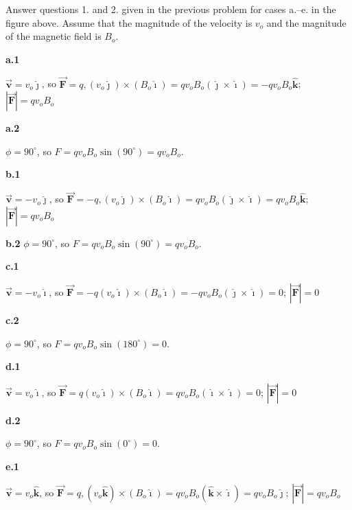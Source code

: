 \documentclass{article}
\newcommand{\ihat}[0]{\hat{\boldsymbol{\imath}}}
\newcommand{\jhat}[0]{\hat{\boldsymbol{\jmath}}}
\newcommand{\khat}[0]{\hat{\boldsymbol{k}}}
\newcommand{\bfvec}[1]{\vec{\mathbf{#1}}}
\begin{document}
Answer questions 1. and 2. given in the previous problem for cases a.--e. in the figure above. Assume that the magnitude of the velocity is $v_o$ and the magnitude of the magnetic field is $B_o$.

{\bf a.1}

\ifsolutions
$\bfvec{v}=v_o\jhat$, so $\bfvec{F} = q,(v_o\jhat)\times (B_o\ihat)=qv_oB_o(\jhat\times \ihat)=-qv_oB_o\khat$; $|\bfvec{F}|=qv_oB_o$
\else

\vskip 48pt
\fi
\ifsolutions\else
\vskip 48pt
\fi

{\bf a.2}

\ifsolutions
$\phi=90^{\circ}$, so $F = qv_oB_o\sin(90^{\circ})=qv_oB_o$.
\fi

{\bf b.1}

\ifsolutions
$\bfvec{v}=-v_o\jhat$, so $\bfvec{F} = -q,(v_o\jhat)\times (B_o\ihat)=qv_oB_o(\jhat\times \ihat)=qv_oB_o\khat$; $|\bfvec{F}|=qv_oB_o$
\else

\vskip 48pt
\fi
\ifsolutions\else
\vskip 48pt
\fi
{\bf b.2}
\ifsolutions
$\phi=90^{\circ}$, so $F = qv_oB_o\sin(90^{\circ})=qv_oB_o$.
\else

\vskip 48pt
\fi
\ifsolutions\else
\vskip 48pt
\fi

{\bf c.1}

\ifsolutions
$\bfvec{v}=-v_o\ihat$, so $\bfvec{F} = -q(v_o\ihat)\times (B_o\ihat)=-qv_oB_o(\jhat\times \ihat)=0$; $|\bfvec{F}|=0$
\else

\vskip 48pt
\fi
\ifsolutions\else
\vskip 48pt
\fi

{\bf c.2}

\ifsolutions
$\phi=90^{\circ}$, so $F = qv_oB_o\sin(180^{\circ})=0$.
\else

\vskip 48pt
\fi
\ifsolutions\else
\vskip 48pt
\fi

{\bf d.1}

\ifsolutions
$\bfvec{v}=v_o\ihat$, so $\bfvec{F} = q(v_o\ihat)\times (B_o\ihat)=qv_oB_o(\ihat\times \ihat)=0$; $|\bfvec{F}|=0$
\else

\vskip 48pt
\fi
\ifsolutions\else
\vskip 48pt
\fi

{\bf d.2}

\ifsolutions
$\phi=90^{\circ}$, so $F = qv_oB_o\sin(0^{\circ})=0$.
\else

\vskip 48pt
\fi
\ifsolutions\else
\vskip 48pt
\fi

{\bf e.1}

\ifsolutions
$\bfvec{v}=v_o\khat$, so $\bfvec{F} = q,(v_o\khat)\times (B_o\ihat)=qv_oB_o(\khat\times \ihat)=qv_oB_o\jhat$; $|\bfvec{F}|=qv_oB_o$
\else
\end{document}
